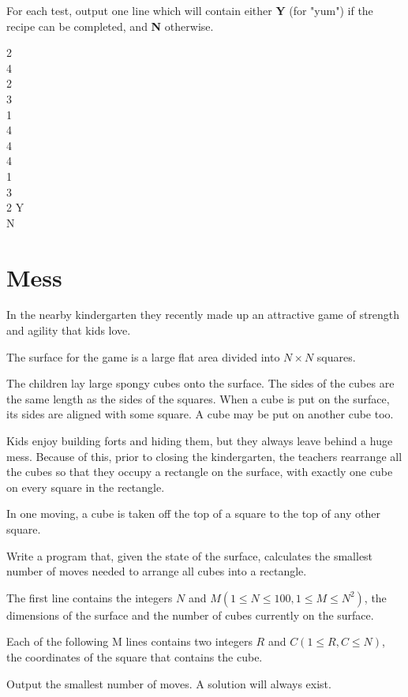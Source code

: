 \documentclass{contest-set}
\begin{document}
\outputformat
For each test, output one line which will contain either  \textbf{Y} (for "yum") if the recipe can be completed, and  \textbf{N} otherwise.

\addsample
{
2\\
4\\
2\\
3\\
1\\
4\\
4\\
4\\
1\\
3\\
2
}
{
Y\\
N
}

\newpage
\section{Mess}
In the nearby kindergarten they recently made up an attractive game of strength and agility that kids love.

The surface for the game is a large flat area divided into $N\times N$ squares.

The children lay large spongy cubes onto the surface. The sides of the cubes are the same length as the sides of the squares. When a cube is put on the surface, its sides are aligned with some square. A cube may be put on another cube too.

Kids enjoy building forts and hiding them, but they always leave behind a huge mess. Because of this, prior to closing the kindergarten, the teachers rearrange all the cubes so that they occupy a rectangle on the surface, with exactly one cube on every square in the rectangle.

In one moving, a cube is taken off the top of a square to the top of any other square.

Write a program that, given the state of the surface, calculates the smallest number of moves needed to arrange all cubes into a rectangle.

The first line contains the integers $N$ and $M (1\leq N\leq 100,1\leq M\leq N^2)$, the dimensions of the surface and the number of cubes currently on the surface.

Each of the following M lines contains two integers $R$ and $C (1\leq R,C\leq N)$, the coordinates of the square that contains the cube.

\outputformat
Output the smallest number of moves. A solution will always exist.
\end{document}
